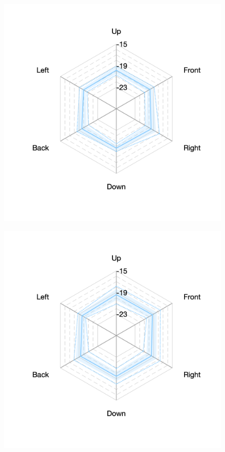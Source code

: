 \documentclass[11pt,a4j]{jreport}
\begin{document}
\begin{figure}[H]
      \begin{minipage}[b]{.33\textwidth}
        \hspace{1 \linewidth}
      \end{minipage}%
      \begin{minipage}[b]{.33\textwidth}
        \centering
        \includegraphics[width=1\linewidth]{images/realHallDirSt/late_S10_allhall.png}
        \label{fig:S10late}
      \end{minipage}%
      \begin{minipage}[b]{.33\textwidth}
        \centering
        \includegraphics[width=1\linewidth]{images/realHallDirSt/late_S09_allhall.png}
        \label{fig:S09late}
      \end{minipage}


\end{figure}
\end{document}

